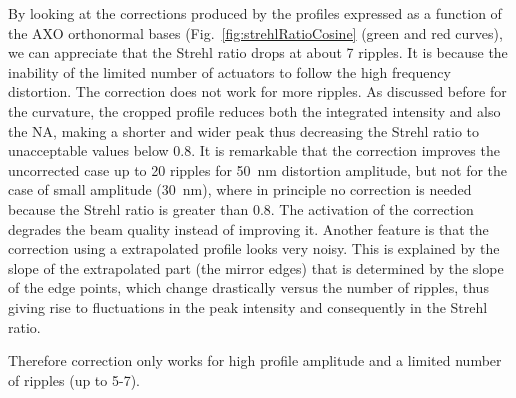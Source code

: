 \documentclass{iucr}
\begin{document}
By looking at the corrections produced by the profiles expressed as a function of the AXO orthonormal bases (Fig.~\ref{fig:strehlRatioCosine} (green and red curves), we can appreciate that the Strehl ratio drops at about 7 ripples. It is because the inability of the limited number of actuators to follow the high frequency distortion. The correction does not work for more ripples. As discussed before for the curvature, the cropped profile reduces both the integrated intensity and also the NA, making a shorter and wider peak thus decreasing the Strehl ratio to unacceptable values below 0.8. It is remarkable that the correction improves the uncorrected case up to 20 ripples for 50~nm distortion amplitude, but not for the case of small amplitude (30~nm), where in principle no correction is needed because the Strehl ratio is greater than 0.8. The activation of the correction degrades the beam quality instead of improving it. 
Another feature is that the correction using a extrapolated profile looks very noisy. This is explained by the slope of the extrapolated part (the mirror edges) that is determined by the slope of the edge points, which change drastically versus the number of ripples, thus giving rise to fluctuations in the peak intensity and consequently in the Strehl ratio.


Therefore correction only works for high profile amplitude and a limited number of ripples (up to 5-7).
 
\end{document}
